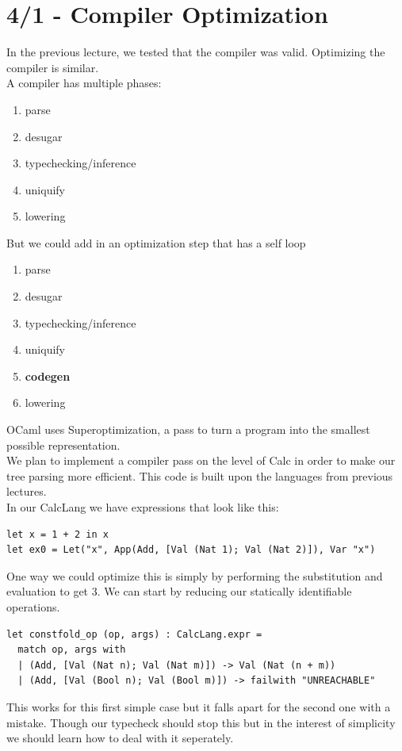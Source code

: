 \section{4/1 - Compiler Optimization}
In the previous lecture, we tested that the compiler was valid. Optimizing the compiler is similar.
\\
A compiler has multiple phases:
\begin{enumerate}
  \item parse
  \item desugar
  \item typechecking/inference
  \item uniquify
  \item lowering
\end{enumerate}
But we could add in an optimization step that has a self loop
\begin{enumerate}
  \item parse
  \item desugar
  \item typechecking/inference
  \item uniquify
  \item \textbf{codegen}
  \item lowering
\end{enumerate}
OCaml uses Superoptimization, a pass to turn a program into the smallest possible representation.
\\
We plan to implement a compiler pass on the level of Calc in order to make our tree parsing more efficient. This code is built upon the languages from previous lectures.
\\
In our CalcLang we have expressions that look like this:
\begin{lstlisting}
let x = 1 + 2 in x
let ex0 = Let("x", App(Add, [Val (Nat 1); Val (Nat 2)]), Var "x")
\end{lstlisting}
One way we could optimize this is simply by performing the substitution and evaluation to get $3$. We can start by reducing our statically identifiable operations.
\begin{lstlisting}
let constfold_op (op, args) : CalcLang.expr =
  match op, args with
  | (Add, [Val (Nat n); Val (Nat m)]) -> Val (Nat (n + m))
  | (Add, [Val (Bool n); Val (Bool m)]) -> failwith "UNREACHABLE"
\end{lstlisting}
This works for this first simple case but it falls apart for the second one with a mistake. Though our typecheck should stop this but in the interest of simplicity we should learn how to deal with it seperately.
